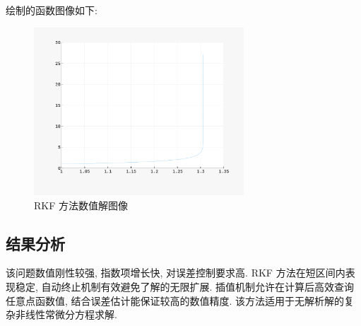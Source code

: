 \documentclass[12pt]{article}
\begin{document}
			绘制的函数图像如下:

			\begin{figure}[htbp]
			\centering
			\includegraphics[width=0.7\textwidth]{figure/rkf.png}
			\caption{RKF 方法数值解图像}
			\end{figure}

		\subsection{结果分析}
			该问题数值刚性较强, 指数项增长快, 对误差控制要求高. RKF 方法在短区间内表现稳定, 自动终止机制有效避免了解的无限扩展.  插值机制允许在计算后高效查询任意点函数值, 结合误差估计能保证较高的数值精度. 该方法适用于无解析解的复杂非线性常微分方程求解.
\end{document}
